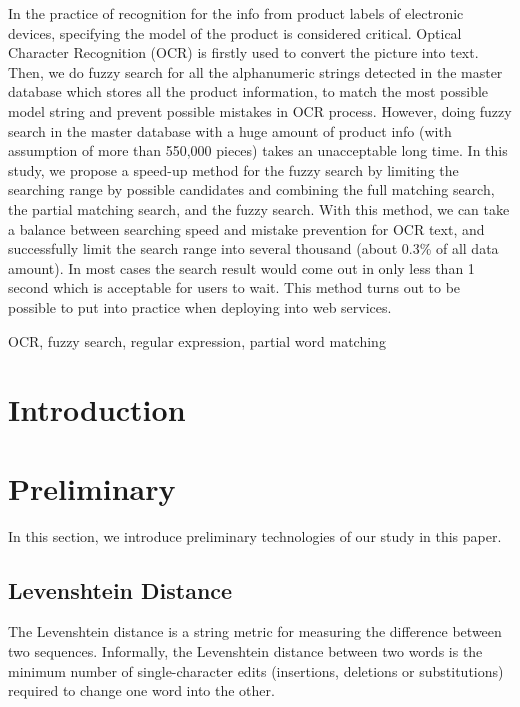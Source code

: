 \documentclass[technicalreport]{ieicej}
\begin{document}
\begin{eabstract}
In the practice of recognition for the info from product labels of electronic devices, specifying the model of the product is considered critical. Optical Character Recognition (OCR) is firstly used to convert the picture into text. Then, we do fuzzy search for all the alphanumeric strings detected in the master database which stores all the product information, to match the most possible model string and prevent possible mistakes in OCR process. 
However, doing fuzzy search in the master database with a huge amount of product info (with assumption of more than 550,000 pieces) takes an unacceptable long time.
In this study, we propose a speed-up method for the fuzzy search by limiting the searching range by possible candidates and combining the full matching search, the partial matching search, and the fuzzy search. 
With this method, we can take a balance between searching speed and mistake prevention for OCR text, and successfully limit the search range into several thousand (about 0.3\% of all data amount). In most cases the search result would come out in only less than 1 second which is acceptable for users to wait. This method turns out to be possible to put into practice when deploying into web services.  
\end{eabstract}
\begin{ekeyword}
OCR, fuzzy search, regular expression, partial word matching
\end{ekeyword}
\maketitle

\section{Introduction}

\section{Preliminary}
\label{sec:efp}
    In this section, we introduce preliminary technologies of our study in this paper.

    \subsection{Levenshtein Distance}
        The Levenshtein distance is a string metric for measuring the difference between two sequences. Informally, the Levenshtein distance between two words is the minimum number of single-character edits (insertions, deletions or substitutions) required to change one word into the other.
\end{document}
